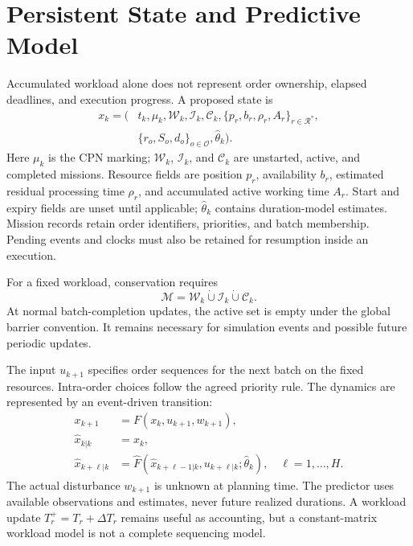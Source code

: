 \section{Persistent State and Predictive Model}

Accumulated workload alone does not represent order ownership, elapsed
deadlines, and execution progress. A proposed state is
\begin{equation}
\begin{split}
 x_k=\big(&t_k,\mu_k,\mathcal W_k,\mathcal I_k,\mathcal C_k,
 \{p_r,b_r,\rho_r,A_r\}_{r\in\mathcal R^*},\\
 &\{r_o,S_o,d_o\}_{o\in\mathcal O},\widehat\theta_k\big).
\end{split}
\end{equation}
Here $\mu_k$ is the CPN marking; $\mathcal W_k$, $\mathcal I_k$, and
$\mathcal C_k$ are unstarted, active, and completed missions. Resource fields
are position $p_r$, availability $b_r$, estimated residual processing time
$\rho_r$, and accumulated active working time $A_r$. Start and expiry fields
are unset until applicable; $\widehat\theta_k$ contains duration-model
estimates. Mission records retain order identifiers, priorities, and batch
membership. Pending events and clocks must also be retained for resumption
inside an execution.

For a fixed workload, conservation requires
\begin{equation}
 \mathcal M=\mathcal W_k\mathbin{\dot\cup}\mathcal I_k
 \mathbin{\dot\cup}\mathcal C_k.
\end{equation}
At normal batch-completion updates, the active set is empty under the global
barrier convention. It remains necessary for simulation events and possible
future periodic updates.

The input $u_{k+1}$ specifies order sequences for the next batch on the fixed
resources. Intra-order choices follow the agreed priority rule. The dynamics
are represented by an event-driven transition:
\begin{align}
 x_{k+1}&=F(x_k,u_{k+1},w_{k+1}),\\
 \widehat x_{k|k}&=x_k,\\
 \widehat x_{k+\ell|k}&=\widehat F(\widehat x_{k+\ell-1|k},
 u_{k+\ell|k};\widehat\theta_k),\quad\ell=1,\ldots,H.
\end{align}
The actual disturbance $w_{k+1}$ is unknown at planning time. The predictor
uses available observations and estimates, never future realized durations.
A workload update $T_r^+=T_r+\Delta T_r$ remains useful as accounting, but a
constant-matrix workload model is not a complete sequencing model.

